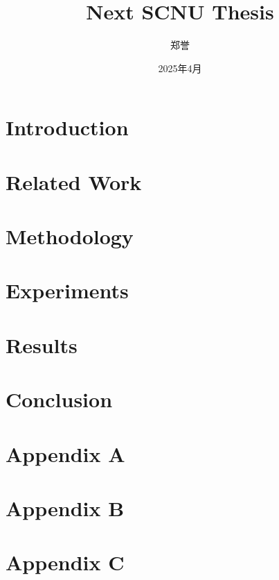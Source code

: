 \documentclass{scnuthesis}
\title{Next SCNU Thesis}
\author{郑誉}
\date{2025年4月}
\begin{document}
    \maketitle

    \begin{abstracten}
    \end{abstracten}

    \begin{abstractzh}
    \end{abstractzh}

    \toc


    \section{Introduction}
    \section{Related Work}
    \section{Methodology}
    \section{Experiments}
    \section{Results}
    \section{Conclusion}

    \appendix
    \section{Appendix A}
    \section{Appendix B}
    \section{Appendix C}

    \acknowledgements
\end{document}
